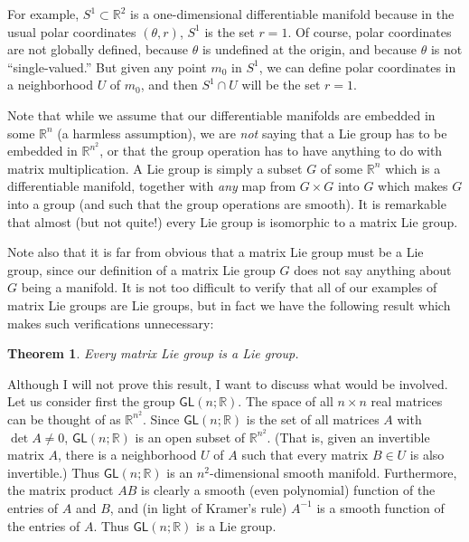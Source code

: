 \documentclass[12pt]{amsbook}
\theoremstyle{plain}
\newtheorem{theorem}{Theorem}
\numberwithin{equation}{chapter}
\numberwithin{theorem}{chapter}
\begin{document}
For example, $S^{1}\subset\mathbb{R}^{2}$ is a one-dimensional differentiable
manifold because in the usual polar coordinates $(\theta,r)$, $S^{1}$ is the
set $r=1$. Of course, polar coordinates are not globally defined, because
$\theta$ is undefined at the origin, and because $\theta$ is not
``single-valued.'' But given any point $m_{0}$ in $S^{1}$, we can define polar
coordinates in a neighborhood $U$ of $m_{0}$, and then $S^{1}\cap U$ will be
the set $r=1$.

Note that while we assume that our differentiable manifolds are embedded in
some $\mathbb{R}^{n}$ (a harmless assumption), we are \textit{not} saying that
a Lie group has to be embedded in $\mathbb{R}^{n^{2}}$, or that the group
operation has to have anything to do with matrix multiplication. A Lie group
is simply a subset $G$ of some $\mathbb{R}^{n}$ which is a differentiable
manifold, together with \textit{any} map from $G\times G$ into $G$ which makes
$G$ into a group (and such that the group operations are smooth). It is
remarkable that almost (but not quite!) every Lie group is isomorphic to a
matrix Lie group.

Note also that it is far from obvious that a matrix Lie group must be a Lie
group, since our definition of a matrix Lie group $G$ does not say anything
about $G$ being a manifold. It is not too difficult to verify that all of our
examples of matrix Lie groups are Lie groups, but in fact we have the
following result which makes such verifications unnecessary:

\begin{theorem}
\label{lie.theorem}Every matrix Lie group is a Lie group.
\end{theorem}

Although I will not prove this result, I want to discuss what would be
involved. Let us consider first the group $\mathsf{GL}(n;\mathbb{R})$. The
space of all $n\times n$ real matrices can be thought of as $\mathbb{R}%
^{n^{2}}$. Since $\mathsf{GL}(n;\mathbb{R})$ is the set of all matrices $A$
with $\det A\neq0$, $\mathsf{GL}(n;\mathbb{R})$ is an open subset of
$\mathbb{R}^{n^{2}}$. (That is, given an invertible matrix $A$, there is a
neighborhood $U$ of $A$ such that every matrix $B\in U$ is also invertible.)
Thus $\mathsf{GL}(n;\mathbb{R})$ is an $n^{2}$-dimensional smooth manifold.
Furthermore, the matrix product $AB$ is clearly a smooth (even polynomial)
function of the entries of $A$ and $B$, and (in light of Kramer's rule)
$A^{-1}$ is a smooth function of the entries of $A$. Thus $\mathsf{GL}%
(n;\mathbb{R})$ is a Lie group.
\end{document}

